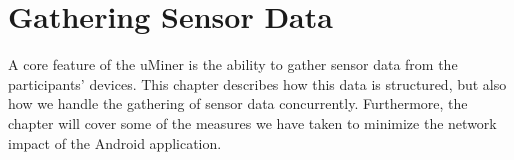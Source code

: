 \chapter{Gathering Sensor Data}
\label{cha:gathering_sensor_data}

A core feature of the uMiner is the ability to gather sensor data from the participants' devices. This chapter describes how this data is structured, but also how we handle the gathering of sensor data concurrently. Furthermore, the chapter will cover some of the measures we have taken to minimize the network impact of the Android application.







